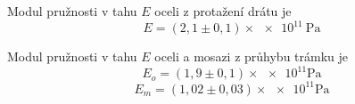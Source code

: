 \documentclass[protokol.tex]{subfiles}
\begin{document}
Modul pružnosti v tahu $E$ oceli z protažení drátu je
$$ E = (2,1 \pm 0,1) \times \num{e11} \ \si{\pascal} $$

Modul pružnosti v tahu $E$ oceli a mosazi z průhybu trámku je
$$ E_o = (1,9 \pm 0,1) \times \num{e11} \si{\pascal} $$
$$ E_m = (1,02 \pm 0,03) \times \num{e11} \si{\pascal} $$
\end{document}
